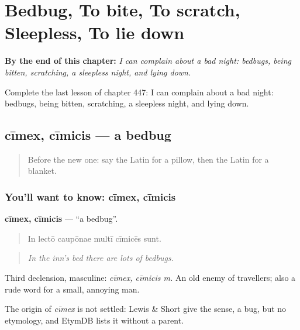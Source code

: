 
\chapter{Bedbug, To bite, To scratch, Sleepless, To lie down}
\label{ch:la-bedbug-to-bite-to-scratch-sleepless-to-lie-down}

\begin{chapteropening}
\textbf{By the end of this chapter:} \emph{I can complain about a bad night: bedbugs, being bitten, scratching, a sleepless night, and lying down.}

Complete the last lesson of chapter 447: I can complain about a bad night: bedbugs, being bitten, scratching, a sleepless night, and lying down.
\end{chapteropening}

\section[cīmex, cīmicis]{cīmex, cīmicis — a bedbug}

\label{lesson:LA-C447-cimex}



\begin{quote}
Before the new one: say the Latin for a pillow, then the Latin for a blanket.
\end{quote}

\subsection*{You'll want to know: cīmex, cīmicis}
\textbf{cīmex, cīmicis} — \textquotedblleft{}a bedbug\textquotedblright{}.

\begin{quote}
In lectō caupōnae multī cīmicēs sunt.
\end{quote}

\begin{quote}
\emph{In the inn's bed there are lots of bedbugs.}
\end{quote}

Third declension, masculine: \emph{cīmex, cīmicis m.} An old enemy of travellers; also a rude word for a small, annoying man.

\begin{cousinweb}
The origin of \emph{cīmex} is not settled: Lewis \& Short give the sense, a bug, but no etymology, and EtymDB lists it without a parent.
\end{cousinweb}

